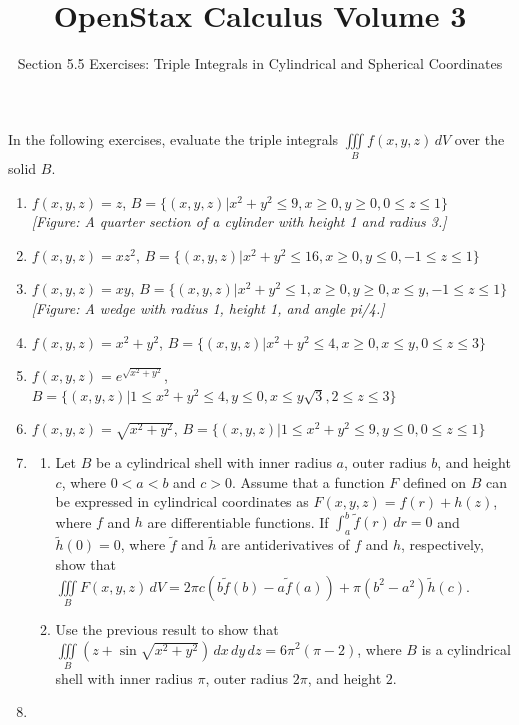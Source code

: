 \documentclass{exercises}
\title{OpenStax Calculus Volume 3}
\subtitle{Section 5.5 Exercises: Triple Integrals in Cylindrical and Spherical Coordinates}
\author{}
\date{}
\begin{document}
\maketitle


In the following exercises, evaluate the triple integrals $\underset{B}{\iiint}f(x,y,z)\,dV$ over the solid $B$.

\begin{enumerate}[start=1]
\item $f(x,y,z)=z$, $B=\{(x,y,z)|x^{2}+y^{2}\le9,x\ge0,y\ge0,0\le z\le1\}$ \\ \textit{[Figure: A quarter section of a cylinder with height 1 and radius 3.]}
\item $f(x,y,z)=xz^{2}$, $B=\{(x,y,z)|x^{2}+y^{2}\le16,x\ge0,y\le0,-1\le z\le1\}$
\item $f(x,y,z)=xy$, $B=\{(x,y,z)|x^{2}+y^{2}\le1,x\ge0,y\ge0,x\le y,-1\le z\le1\}$ \\ \textit{[Figure: A wedge with radius 1, height 1, and angle pi/4.]}
\item $f(x,y,z)=x^{2}+y^{2}$, $B=\{(x,y,z)|x^{2}+y^{2}\le4,x\ge0,x\le y,0\le z\le3\}$
\item $f(x,y,z)=e^{\sqrt{x^{2}+y^{2}}}$, $B=\{(x,y,z)|1\le x^{2}+y^{2}\le4,y\le0,x\le y\sqrt{3},2\le z\le3\}$
\item $f(x,y,z)=\sqrt{x^{2}+y^{2}}$, $B=\{(x,y,z)|1\le x^{2}+y^{2}\le9,y\le0,0\le z\le1\}$
\item
\begin{enumerate}[label=(\alph*)]
  \item Let $B$ be a cylindrical shell with inner radius $a$, outer radius $b$, and height $c$, where $0<a<b$ and $c>0$. Assume that a function $F$ defined on $B$ can be expressed in cylindrical coordinates as $F(x,y,z)=f(r)+h(z)$, where $f$ and $h$ are differentiable functions. If $\int_{a}^{b}\tilde{f}(r)\,dr=0$ and $\tilde{h}(0)=0$, where $\tilde{f}$ and $\tilde{h}$ are antiderivatives of $f$ and $h$, respectively, show that\\ $\underset{B}{\iiint}F(x,y,z)\,dV=2\pi c(b\tilde{f}(b)-a\tilde{f}(a))+\pi(b^{2}-a^{2})\tilde{h}(c)$.
  \item Use the previous result to show that $\underset{B}{\iiint}(z+\sin \sqrt{x^{2}+y^{2}})\,dx\,dy\,dz=6\pi^{2}(\pi-2)$, where $B$ is a cylindrical shell with inner radius $\pi$, outer radius $2\pi$, and height $2$.
\end{enumerate}
\item
\begin{enumerate}[label=(\alph*)]

\end{enumerate}
\end{enumerate}
\end{document}
